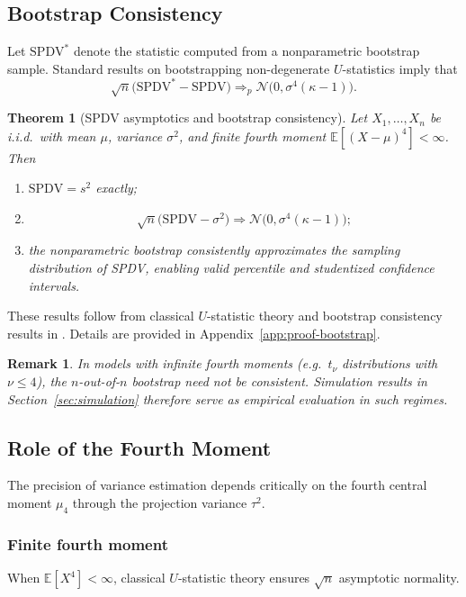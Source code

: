 \documentclass[12pt,a4paper]{article}
\newtheorem{theorem}{Theorem}
\newtheorem{remark}{Remark}
\begin{document}
\subsection{Bootstrap Consistency}\label{sec:bootstrap}

Let $\text{SPDV}^*$ denote the statistic computed from a nonparametric bootstrap sample. Standard results on bootstrapping non-degenerate $U$-statistics \citep{bickel1981,arcones1992,vaart1998} imply that
\[
\sqrt{n}\bigl(\text{SPDV}^* - \text{SPDV}\bigr)
\Rightarrow_p
\mathcal{N}\bigl(0,\sigma^4(\kappa-1)\bigr).
\]

\begin{theorem}[SPDV asymptotics and bootstrap consistency]\label{thm:spdv-bootstrap}
Let $X_1,\dots,X_n$ be i.i.d.\ with mean $\mu$, variance $\sigma^2$, and finite fourth moment $\mathbb{E}[(X-\mu)^4]<\infty$. Then
\begin{enumerate}
\item $\text{SPDV} = s^2$ exactly;
\item
\[
\sqrt{n}\bigl(\text{SPDV}-\sigma^2\bigr)
\Rightarrow
\mathcal{N}\bigl(0,\sigma^4(\kappa-1)\bigr);
\]
\item
the nonparametric bootstrap consistently approximates the sampling distribution of SPDV, enabling valid percentile and studentized confidence intervals.
\end{enumerate}
\end{theorem}

These results follow from classical $U$-statistic theory and bootstrap consistency results in \citet{bickel1981,arcones1992,vaart1998}. Details are provided in Appendix~\ref{app:proof-bootstrap}.

\begin{remark}
In models with infinite fourth moments (e.g.\ $t_\nu$ distributions with $\nu \le 4$), the $n$-out-of-$n$ bootstrap need not be consistent. Simulation results in Section~\ref{sec:simulation} therefore serve as empirical evaluation in such regimes.
\end{remark}

\subsection{Role of the Fourth Moment}

The precision of variance estimation depends critically on the fourth central moment $\mu_4$ through the projection variance $\tau^2$.

\subsubsection{Finite fourth moment}
When $\mathbb{E}[X^4] < \infty$, classical $U$-statistic theory \citep{hoeffding1948,serfling1980} ensures $\sqrt{n}$ asymptotic normality.
\end{document}
